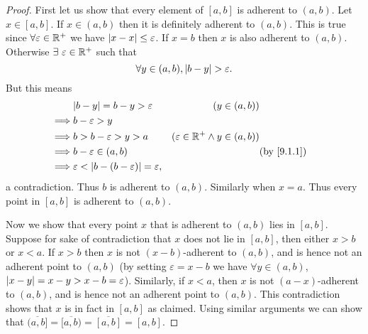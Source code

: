 \begin{proof}
  First let us show that every element of \([a, b]\) is adherent to \((a, b)\).
  Let \(x \in [a, b]\).
  If \(x \in (a, b)\) then it is definitely adherent to \((a, b)\).
  This is true since \(\forall \varepsilon \in \mathbb{R}^+\) we have \(\left\lvert x - x\right\rvert \leq \varepsilon\).
  If \(x = b\) then \(x\) is also adherent to \((a, b)\).
  Otherwise \(\exists\ \varepsilon \in \mathbb{R}^+\) such that
  \[
    \forall y \in (a, b), \left\lvert b - y\right\rvert > \varepsilon.
  \]
  But this means
  \begin{align*}
             & \abs{b - y} = b - y > \varepsilon                        & (y \in (a, b))                                                       \\
    \implies & b - \varepsilon > y                                                                                                             \\
    \implies & b > b - \varepsilon > y > a                              & (\varepsilon \in \R^+ \land y \in (a, b))                            \\
    \implies & b - \varepsilon \in (a, b)                               &                                           & \text{(by \cref{9.1.1})} \\
    \implies & \varepsilon < \abs{b - (b - \varepsilon)} = \varepsilon,
  \end{align*}
  a contradiction.
  Thus \(b\) is adherent to \((a, b)\).
  Similarly when \(x = a\).
  Thus every point in \([a, b]\) is adherent to \((a, b)\).

  Now we show that every point \(x\) that is adherent to \((a, b)\) lies in \([a, b]\).
  Suppose for sake of contradiction that \(x\) does not lie in \([a, b]\), then either \(x > b\) or \(x < a\).
  If \(x > b\) then \(x\) is not \((x - b)\)-adherent to \((a, b)\), and is hence not an adherent point to \((a, b)\)
  (by setting \(\varepsilon = x - b\) we have \(\forall y \in (a, b)\), \(\left\lvert x - y\right\rvert = x - y > x - b = \varepsilon\)).
  Similarly, if \(x < a\), then \(x\) is not \((a - x)\)-adherent to \((a, b)\), and is hence not an adherent point to \((a, b)\).
  This contradiction shows that \(x\) is in fact in \([a, b]\) as claimed.
  Using similar arguments we can show that \(\overline{(a, b]} = \overline{[a, b)} = \overline{[a, b]} = [a, b]\).


\end{proof}
